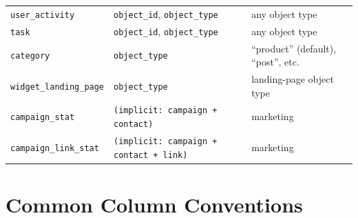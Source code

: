 \documentclass[11pt,a4paper]{article}
\begin{document}
\begin{longtable}{>{\raggedright\arraybackslash}p{4.3cm}>{\raggedright\arraybackslash}p{4.6cm}>{\raggedright\arraybackslash}p{5.5cm}}
\texttt{user\_activity}         & \texttt{object\_id}, \texttt{object\_type}             & any object type \\
\texttt{task}                   & \texttt{object\_id}, \texttt{object\_type}             & any object type \\
\texttt{category}               & \texttt{object\_type}                                  & ``product'' (default), ``post'', etc. \\
\texttt{widget\_landing\_page}  & \texttt{object\_type}                                  & landing-page object type \\
\texttt{campaign\_stat}         & \texttt{(implicit: campaign + contact)}               & marketing \\
\texttt{campaign\_link\_stat}   & \texttt{(implicit: campaign + contact + link)}        & marketing \\
\end{longtable}

\section{Common Column Conventions}\label{app:conventions}
\end{document}
